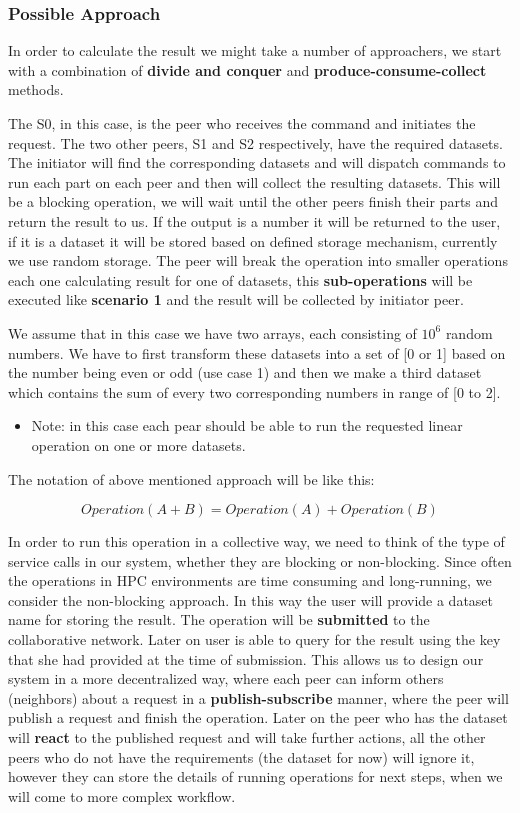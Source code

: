 \subsubsection{Possible Approach}
In order to calculate the result we might take a number of approachers, we start with a combination of \textbf{divide and conquer} and
\textbf{produce-consume-collect} methods.

The S0, in this case, is the peer who receives the command and initiates the request. The two other peers, S1 and S2 respectively, have the required
datasets. The initiator will find the corresponding datasets and will dispatch commands to run each part on each peer and then will collect
the resulting datasets. This will be a blocking operation, we will wait until the other peers finish their parts and return the result
to us. If the output is a number it will be returned to the user, if it is a dataset it will be stored based on defined storage mechanism, 
currently we use random storage. The peer will break the operation into smaller operations each one calculating result for one of datasets, 
this \textbf{sub-operations} will be executed like \textbf{scenario 1} and the result will be collected by initiator peer.

We assume that in this case we have two arrays, each consisting of \(10^6\) random numbers. We have to first transform these datasets into
a set of [0 or 1] based on the number being even or odd (use case 1) and then we make a third dataset which contains the sum of every two
corresponding numbers in range of [0 to 2].


\begin{itemize}
\item Note: in this case each pear should be able to run the requested linear operation on one or more datasets.
\end{itemize}

The notation of above mentioned approach will be like this:

\[ Operation(A + B) = Operation(A) + Operation(B) \]

In order to run this operation in a collective way, we need to think of the type of service calls in our system, whether they are blocking or
non-blocking. Since often the operations in HPC environments are time consuming and long-running, we consider the non-blocking approach. In
this way the user will provide a dataset name for storing the result. The operation will be \textbf{submitted} to the collaborative network.
Later on user is able to query for the result using the key that she had provided at the time of submission. This allows us to design our system
in a more decentralized way, where each peer can inform others (neighbors) about a request in a \textbf{publish-subscribe} manner, where the peer
will publish a request and finish the operation. Later on the peer who has the dataset will \textbf{react} to the published request and will take
further actions, all the other peers who do not have the requirements (the dataset for now) will ignore it, however they can store the details of 
running operations for next steps, when we will come to more complex workflow.

